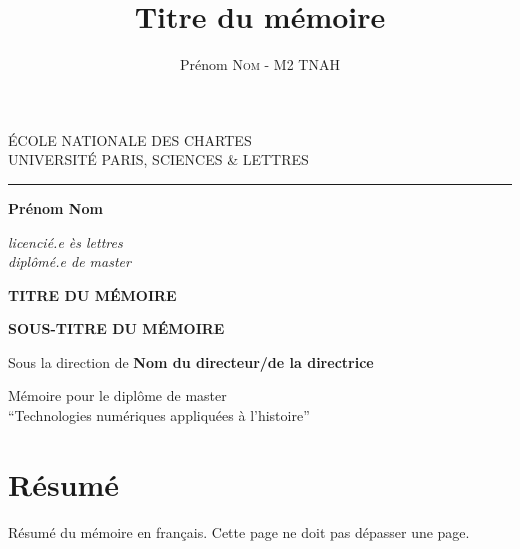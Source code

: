\documentclass[12pt,twoside]{book}
\author{Prénom \textsc{Nom} - M2 TNAH}
\title{Titre du mémoire}
\begin{document}
	\begin{titlepage}
		\begin{center}
			
			\bigskip
			
			\begin{large}				
				ÉCOLE NATIONALE DES CHARTES\\
				UNIVERSITÉ PARIS, SCIENCES \& LETTRES
			\end{large}
			\begin{center}\rule{2cm}{0.02cm}\end{center}
			
			\bigskip
			\bigskip
			\bigskip
			\begin{Large}
				\textbf{Prénom Nom}\\
			\end{Large}
			\begin{normalsize} \textit{licencié.e ès lettres}\\
				\textit{diplômé.e de master}
			\end{normalsize}
			
			\bigskip
			\bigskip
			\bigskip
			
			\begin{Huge}
				\textbf{TITRE DU MÉMOIRE}\\
			\end{Huge}
			\bigskip
			\bigskip
			\begin{LARGE}
				\textbf{SOUS-TITRE DU MÉMOIRE}\\
			\end{LARGE}
			
			\bigskip
			\bigskip
			\bigskip
			\begin{large}
				Sous la direction de \textbf{Nom du directeur/de la directrice}
			\end{large}
			\vfill
			
			\begin{large}
				Mémoire 
				pour le diplôme de master \\
				\enquote{Technologies numériques appliquées à l'histoire} \\
			\end{large}
			
		\end{center}
	\end{titlepage}

	\thispagestyle{empty}	
	\cleardoublepage
	
\frontmatter

	\chapter{Résumé}
\medskip
	Résumé du mémoire en français. Cette page ne doit pas dépasser une page.\\
	
\end{document}
